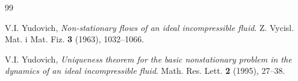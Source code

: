\documentclass[11pt, a4paper,leqno]{amsart}
\theoremstyle{plain}
\numberwithin{equation}{section}
\theoremstyle{definition}
\theoremstyle{remark}
\begin{document}
\begin{thebibliography}{99}

V.I. Yudovich, \emph{Non-stationary flows of an ideal
incompressible fluid}. Z. Vycisl. Mat. i Mat. Fiz. \textbf{3} (1963), 1032--1066.

V.I. Yudovich, \emph{Uniqueness theorem for the basic
nonstationary problem in the dynamics of an ideal incompressible fluid}. Math.
Res. Lett. \textbf{2} (1995), 27--38.
\end{thebibliography}

%
%
%
%
\end{document}
